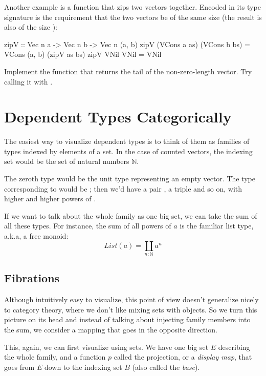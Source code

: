 \documentclass[DaoFP]{subfiles}
\begin{document}
Another example is a function that zips two vectors together. Encoded in its type signature is the requirement that the two vectors be of the same size  (the result is also of the size ):
\begin{haskell}
zipV :: Vec n a -> Vec n b -> Vec n (a, b)
zipV (VCons a as) (VCons b bs) = VCons (a, b) (zipV as bs)
zipV VNil VNil = VNil
\end{haskell}

\begin{exercise}
Implement the function  that returns the tail of the non-zero-length vector. Try calling it with .
\end{exercise}

\section{Dependent Types Categorically}

The easiest way to visualize dependent types is to think of them as families of types indexed by elements of a set. In the case of counted vectors, the indexing set would be the set of natural numbers $\mathbb{N}$.

The zeroth type would be the unit type \hask{()} representing an empty vector. The type corresponding to  would be ; then we'd have a pair , a triple  and so on, with higher and higher powers of .

If we want to talk about the whole family as one big set, we can take the sum of all these types. For instance, the sum of all powers of $a$ is the familiar list type, a.k.a, a free monoid:
\[ \mathit{List} (a) = \coprod_{n:\mathbb{N}} a^n \]

\subsection{Fibrations}

Although intuitively easy to visualize, this point of view doesn't generalize nicely to category theory, where we don't like mixing sets with objects. So we turn this picture on its head and instead of talking about injecting family members into the sum, we consider a mapping that goes in the opposite direction. 

This, again, we can first visualize using sets. We have one big set $E$ describing the whole family, and a function $p$ called the projection, or a \emph{display map}, that goes from $E$ down to the indexing set $B$ (also called the \emph{base}). 
\end{document}
